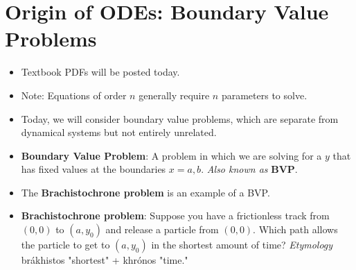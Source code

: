 \documentclass[../notes.tex]{subfiles}
\begin{document}
\section{Origin of ODEs: Boundary Value Problems}
\begin{itemize}
    \item {}Textbook PDFs will be posted today.
    \item Note: Equations of order $n$ generally require $n$ parameters to solve.
    \item Today, we will consider boundary value problems, which are separate from dynamical systems but not entirely unrelated.
    \item \textbf{Boundary Value Problem}: A problem in which we are solving for a $y$ that has fixed values at the boundaries $x=a,b$. \emph{Also known as} \textbf{BVP}.
    \item The \textbf{Brachistochrone problem} is an example of a BVP.
    \item \textbf{Brachistochrone problem}: Suppose you have a frictionless track from $(0,0)$ to $(a,y_0)$ and release a particle from $(0,0)$. Which path allows the particle to get to $(a,y_0)$ in the shortest amount of time? \emph{Etymology} br\'{a}khistos "shortest" + khr\'{o}nos "time."
    \begin{figure}[h!]
        \centering
\end{figure}
\end{itemize}
\end{document}
